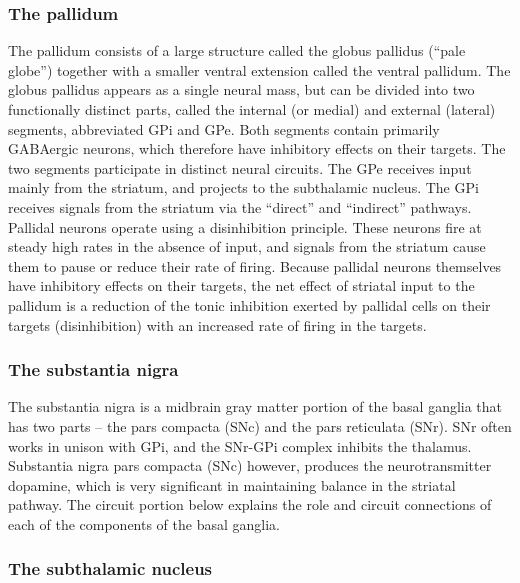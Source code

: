 \documentclass[]{book}
\begin{document}
\hypertarget{the-pallidum}{%
\subsubsection{The pallidum}\label{the-pallidum}}

The pallidum consists of a large structure called the globus pallidus (``pale globe'') together with a smaller ventral extension called the ventral pallidum. The globus pallidus appears as a single neural mass, but can be divided into two functionally distinct parts, called the internal (or medial) and external (lateral) segments, abbreviated GPi and GPe. Both segments contain primarily GABAergic neurons, which therefore have inhibitory effects on their targets. The two segments participate in distinct neural circuits. The GPe receives input mainly from the striatum, and projects to the subthalamic nucleus. The GPi receives signals from the striatum via the ``direct'' and ``indirect'' pathways. Pallidal neurons operate using a disinhibition principle. These neurons fire at steady high rates in the absence of input, and signals from the striatum cause them to pause or reduce their rate of firing. Because pallidal neurons themselves have inhibitory effects on their targets, the net effect of striatal input to the pallidum is a reduction of the tonic inhibition exerted by pallidal cells on their targets (disinhibition) with an increased rate of firing in the targets.

\hypertarget{the-substantia-nigra}{%
\subsubsection{The substantia nigra}\label{the-substantia-nigra}}

The substantia nigra is a midbrain gray matter portion of the basal ganglia that has two parts -- the pars compacta (SNc) and the pars reticulata (SNr). SNr often works in unison with GPi, and the SNr-GPi complex inhibits the thalamus. Substantia nigra pars compacta (SNc) however, produces the neurotransmitter dopamine, which is very significant in maintaining balance in the striatal pathway. The circuit portion below explains the role and circuit connections of each of the components of the basal ganglia.

\hypertarget{the-subthalamic-nucleus}{%
\subsubsection{The subthalamic nucleus}\label{the-subthalamic-nucleus}}
\end{document}

